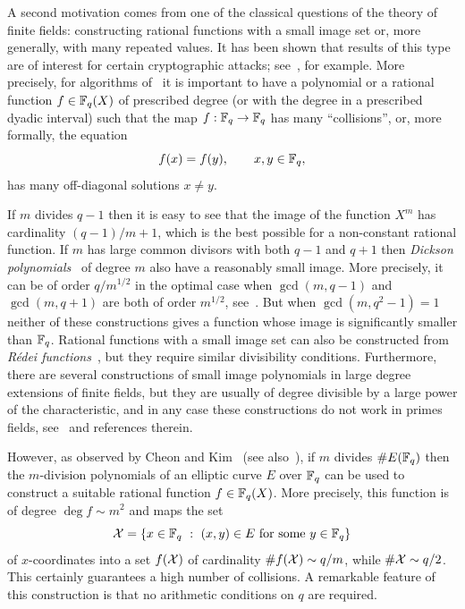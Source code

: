 \documentclass[12pt]{amsart}
\begin{document}
A second motivation comes from one of the classical questions
of the theory of finite fields: constructing rational functions 
with  a small image set or, more generally, with many 
repeated values.  
It has been shown 
that results of this type are
of interest for certain cryptographic attacks; see~\cite{Cheon,ChKi1,ChKi2,Kim,KCL}, 
for example.
More precisely, for algorithms of~\cite{Cheon,ChKi1,ChKi2,Kim,KCL} 
it is important to have a polynomial or a rational function $f \in \mathbb{F}_q(X)$ of  prescribed degree (or with
the 
degree in a prescribed dyadic interval) such that the map $f: \mathbb{F}_q \to \mathbb{F}_q$ has many 
``collisions'', or, more formally, the equation 
$$
f(x) = f(y), \qquad x,y \in \mathbb{F}_q,
$$
has many off-diagonal solutions $x \ne y$. 

If $m$ divides $q-1$ then it is easy to see that the image of the
function $X^m$ has cardinality $(q-1)/m + 1$, which
is the best possible for a non-constant rational function.
If $m$ has large common divisors with both $q-1$ and $q+1$ then
{\it Dickson polynomials\/}~\cite{Brewer,Dickson1,Dickson2} of degree $m$ 
also have a reasonably small image. More precisely, 
it can be of order $q/m^{1/2}$ in the 
optimal case when $\gcd(m,q-1)$ and $\gcd(m,q+1)$ are both 
of order $m^{1/2}$, see~\cite[Theorem~9]{CGM}. But when $\gcd(m, q^2-1)=1$ neither of these constructions gives a function whose image is significantly smaller than $\mathbb{F}_q$. 
Rational functions with a small image set can also be constructed from {\it R{\'e}dei
functions\/}~\cite{Red},  but they require similar divisibility conditions.
Furthermore, there are several constructions
of small image polynomials in large degree extensions of finite fields, but they are usually
of degree divisible by a large power of the characteristic, 
and in any case these constructions do not work in primes fields, see~\cite{BoCo}
and references therein. 


However, as observed by Cheon and Kim~\cite{ChKi2} (see also~\cite[Section~3.6]{Kim}), 
if $m$ divides $\#E(\mathbb{F}_q)$
then the $m$-division polynomials of an elliptic curve $E$ over $\mathbb{F}_q$ can be 
used to construct a suitable rational 
function $f \in \mathbb{F}_q(X)$. More precisely, this function is of degree  $\deg f \sim m^2$ and  maps 
  the set 
$$
{\mathcal X} = \{x \in \mathbb{F}_q~:~ (x,y) \in E\ \text{for some}\ y \in \mathbb{F}_q\}
$$
of $x$-coordinates into a set  $f({\mathcal X})$ of  cardinality  $\# f({\mathcal X}) \sim q/m$,
while $\# {\mathcal X} \sim q/2$. This certainly guarantees a high number of collisions. 
A remarkable feature of this construction is that no arithmetic conditions on $q$ are required.
\end{document}
